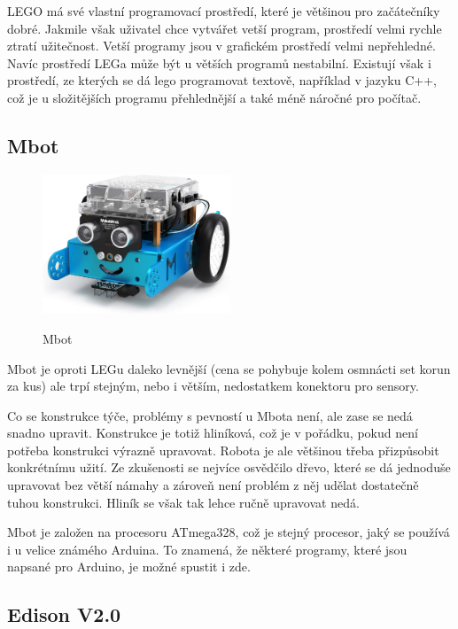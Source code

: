 \documentclass{template/socthesis}
\begin{document}
LEGO má své vlastní programovací prostředí, které je většinou pro začá\-teč\-ní\-ky dobré. Jakmile však uživatel chce vytvářet vetší program, prostředí velmi rychle ztratí užitečnost. Vetší programy jsou v grafickém prostředí velmi nepřehledné. Navíc prostředí LEGa může být u větších programů nestabilní. Existují však i prostředí, ze kterých se dá lego programovat textově, například v jazyku C++, což je u složitějších programu přehlednější a také méně náročné pro počítač.

\subsection{Mbot} 

\begin{figure}[h]
	
	\centering
	\includegraphics[width=0.5\textwidth]{img/Mbot.jpg}
	\caption{Mbot} 
	\cite{Mbot_obr}
	
\end{figure}

Mbot \cite{Mbot} je oproti LEGu daleko levnější (cena se pohybuje kolem osmnácti set korun za kus) ale trpí stejným, nebo i větším, nedostatkem konektoru pro sensory. 

Co se konstrukce týče, problémy s pevností u Mbota není, ale zase se nedá snadno upravit. Konstrukce je totiž hliníková, což je v pořádku, pokud není potřeba konstrukci výrazně upravovat. Robota je ale většinou třeba přizpůsobit konkrétnímu užití.
 Ze zkušenosti se nejvíce osvědčilo dřevo, které se dá jednoduše upravovat bez větší námahy a zároveň není problém z něj udělat dostatečně tuhou konstrukci. Hliník se však tak lehce ručně upravovat nedá.
 
Mbot je založen na procesoru ATmega328, což je stejný procesor, jaký se používá i u velice známého Arduina.
To znamená, že některé programy, které jsou napsané pro Arduino, je možné spustit i zde.

\subsection{Edison V2.0}
\end{document}
